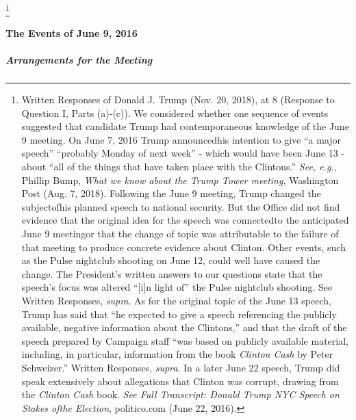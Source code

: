 \footnote{Written Responses of Donald J. Trump (Nov. 20, 2018), at 8 (Response to Question I, Parts (a)-(c)).
We considered whether one sequence of events suggested that candidate Trump had contemporaneous knowledge of the June 9 meeting.
On June 7, 2016 Trump announcedhis intention to give “a major speech” “probably Monday of next week” - which would have been June 13 - about “all of the things that have taken place with the Clintons.”
\textit{See, e.g.}, Phillip Bump, \textit{What we know about the Trump Tower meeting}, Washington Post (Aug. 7, 2018).
Following the June 9 meeting, Trump changed the subjectofhis planned speech to national security.
But the Office did not find evidence that the original idea for the speech was connectedto the anticipated June 9 meetingor that the change of topic was attributable to the failure of that meeting to produce concrete evidence about Clinton.
Other events, such as the Pulse nightclub shooting on June 12, could well have caused the change.
The President’s written answers to our questions state that the speech’s focus was altered “[i]n light of” the Pulse nightclub shooting.
See Written Responses, \textit{supra}.
As for the original topic of the June 13 speech, Trump has said that “he expected to give a speech referencing the publicly available, negative information about the Clintons,” and that the draft of the speech prepared by Campaign staff “was based on publicly available material, including, in particular, information from the book \textit{Clinton Cash} by Peter Schweizer.”
Written Responses, \textit{supra}.
In a later June 22 speech, Trump did speak extensively about allegations that Clinton was corrupt, drawing from the \textit{Clinton Cash} book.
\textit{See Full Transcript: Donald Trump NYC Speech on Stakes ofthe Election}, politico.com (June 22, 2016).}

\paragraph{The Events of June 9, 2016}

\subparagraph{Arrangements for the Meeting}

